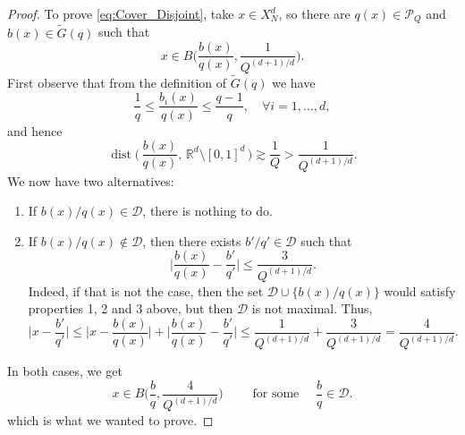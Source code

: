 \documentclass[11pt,reqno]{amsart}
\theoremstyle{definition}
\numberwithin{equation}{section}
\theoremstyle{remark}
\begin{document}
\begin{proof}
To prove \eqref{eq:Cover_Disjoint}, take $x \in X_N^d$,
so there are $q(x) \in \mathcal P_Q$ and $b(x) \in \widetilde{G}(q)$ such that 
\[x \in B\Big( \frac{b(x)}{q(x)}, \frac{1}{Q^{(d+1)/d}} \Big).\] 
First observe that from the definition of $\widetilde{G}(q)$ we have 
\begin{equation}
    \frac{1}{q} \leq \frac{b_i(x)}{q(x)} \leq \frac{q-1}{q}, \quad \forall i = 1, \ldots, d, 
\end{equation}
and hence 
\[
\operatorname{dist} \Big(\,  \frac{b(x)}{q(x)}, \,  \mathbb R^d \setminus [0,1]^d \, \Big) 
\gtrsim \frac{1}{Q} > \frac{1}{Q^{(d+1)/d}}.
\]
We now have two alternatives: 
\begin{enumerate}
    \item If $b(x)/q(x) \in \mathcal D$, there is nothing to do. 

    \item If $b(x)/q(x) \not\in \mathcal D$, then there exists $b'/q' \in \mathcal D$ such that 
    \begin{equation}
        \Big| \frac{b(x)}{q(x)} - \frac{b'}{q'} \Big| \leq \frac{3}{Q^{(d+1)/d}}.
    \end{equation}
    Indeed, if that is not the case, then the set $\mathcal D \cup \{ b(x)/q(x)\}$ would satisfy properties 1, 2 and 3 above, but then $\mathcal D$ is not maximal.  Thus, 
    \begin{equation}
        \Big| x - \frac{b'}{q'} \Big| 
        \leq \Big| x - \frac{b(x)}{q(x)} \Big| + \Big| \frac{b(x)}{q(x)} - \frac{b'}{q'} \Big|
        \leq \frac{1}{Q^{(d+1)/d}} + \frac{3}{Q^{(d+1)/d}}
        = \frac{4}{Q^{(d+1)/d}}.
    \end{equation}
\end{enumerate}
In both cases, we get 
\[x \in B\Big( \frac{b}{q}, \frac{4}{Q^{(d+1)/d}} \Big)
\qquad \text{ for some } \quad \frac{b}{q} \in \mathcal D. 
\] 
which is what we wanted to prove.
\end{proof}
\end{document}
